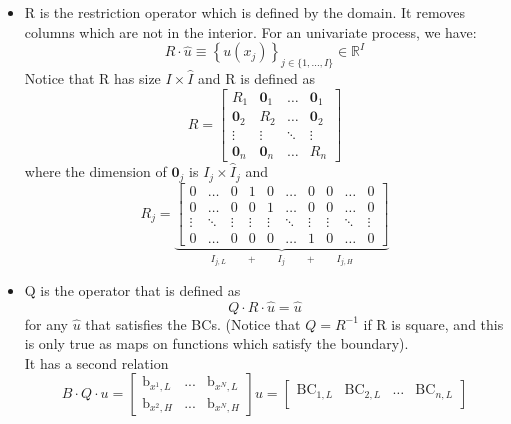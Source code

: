 \documentclass[11pt]{article}
\newcommand{\set}[1]{\ensuremath{\left\{{#1}\right\}}}
\newcommand{\R}{\ensuremath{\mathbb{R}}}
\begin{document}
\begin{itemize}
		\item R is the restriction operator which is defined by the domain. It removes columns which are not in the interior. 
		For an univariate process, we have:
		\begin{equation}
		R\cdot \hat{u}  \equiv\set{u(x_j)}_{j \in \{1,...,I\}} \in \R^{I} \label{R_operator}
		\end{equation}
		Notice that R has size $I \times \hat{I}$ and R is defined as
		\begin{equation}
		R = \begin{bmatrix}
		R_1&\mathbf{0}_1&\dots&\mathbf{0}_1\\
		\mathbf{0}_2&R_2&\dots&\mathbf{0}_2\\
		\vdots&\vdots&\ddots&\vdots\\
		\mathbf{0}_n&\mathbf{0}_n&\dots&R_n
		\end{bmatrix}
		\end{equation}
		where the dimension of $\mathbf{0}_j$ is $I_j\times\hat{I}_j$ and 
		\begin{equation}
		R_j = \underbrace{\begin{bmatrix}
		0&\dots&0&1&0&\dots&0&0&\dots&0\\
		0&\dots&0&0&1&\dots&0&0&\dots&0\\
		\vdots&\ddots&\vdots&\vdots&\vdots&\ddots&\vdots&\vdots&\ddots&\vdots\\
		0&\dots&0&0&0&\dots&1&0&\dots&0
		\end{bmatrix}}_{I_{j, L}\qquad+\qquad I_j\qquad+\qquad I_{j, H}}
		\end{equation}
		\item Q is the operator that is defined as
		\begin{equation}
		Q \cdot R\cdot\hat{u} = \hat{u}\label{Q_operator_1}
		\end{equation}
		for any $\hat{u}$ that satisfies the BCs. (Notice that $Q = R^{-1}$ if R is square, and this is only true as maps on functions which satisfy the boundary).\\
		It has a second relation 
		\begin{equation}
		B\cdot Q\cdot u  = \begin{bmatrix}
		\text{b}_{x^{1},L} & ... & \text{b}_{x^{N},L}\\
		\text{b}_{x^{2},H} & ... & \text{b}_{x^{N},H}
		\end{bmatrix}u=\begin{bmatrix}
		\text{BC}_{1, L}&\text{BC}_{2, L}&\dots&\text{BC}_{n, L}\\

\end{bmatrix}
\end{equation}
\end{itemize}
\end{document}
